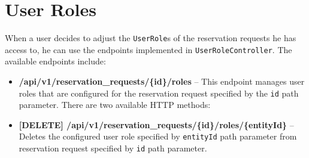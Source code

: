 \section{User Roles}
When a user decides to adjust the \texttt{UserRole}s of the reservation requests he has access to, he can use the endpoints implemented in \texttt{UserRoleController}.
The available endpoints include:
\begin{itemize}
    \item \textbf{/api/v1/reservation\_requests/\{id\}/roles} -- This endpoint manages user roles that are configured for the reservation request specified by the \texttt{id} path parameter. There are two available HTTP methods:
    \item \textbf{[DELETE] /api/v1/reservation\_requests/\{id\}/roles/\{entityId\}} -- Deletes the configured user role specified by \texttt{entityId} path parameter from reservation request specified by \texttt{id} path parameter.
\end{itemize}
